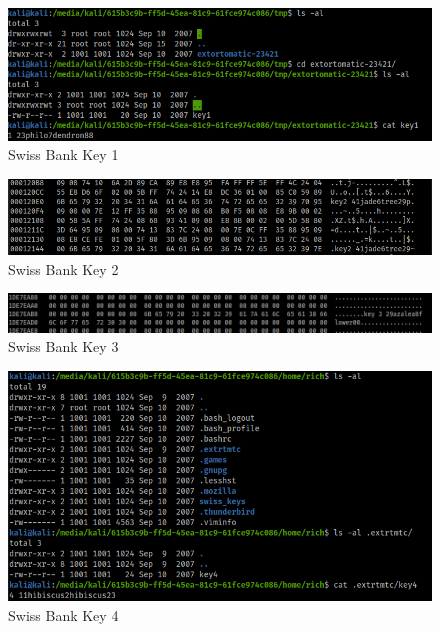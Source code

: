 \documentclass[a4paper,12pt]{article}
\begin{document}
\begin{figure}[H]
	\begin{center}
		\includegraphics[scale = 0.50]{img/act1/key1.png} 
	\end{center}
	\caption{Swiss Bank Key 1}
	\label{key1}
\end{figure}

\begin{figure}[H]
	\begin{center}
		\includegraphics[scale = 0.50]{img/act1/key22.png} 
	\end{center}
	\caption{Swiss Bank Key 2}
	\label{key2}
\end{figure}

\begin{figure}[H]
	\begin{center}
		\includegraphics[scale = 0.50]{img/act1/key3.png} 
	\end{center}
	\caption{Swiss Bank Key 3}
	\label{key3}
\end{figure}

\begin{figure}[H]
	\begin{center}
		\includegraphics[scale = 0.50]{img/act1/key4.png} 
	\end{center}
	\caption{Swiss Bank Key 4}
	\label{key4}
\end{figure}
\end{document}
